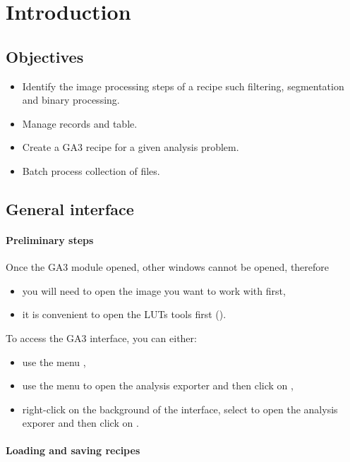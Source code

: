 \section{Introduction}

\subsection{Objectives}

\begin{itemize}
    \item Identify the image processing steps of a recipe such filtering, segmentation and binary processing.
    \item Manage records and table.
    \item Create a GA3 recipe for a given analysis problem.
    \item Batch process collection of files.
\end{itemize}

\subsection{General interface}

\paragraph{Preliminary steps}
Once the GA3 module opened, other windows cannot be opened, therefore
\begin{itemize}
    \item you will need to open the image you want to work with first,
    \item it is convenient to open the LUTs tools first ().
\end{itemize}
To access the GA3 interface, you can either:
\begin{itemize}
    \item use the menu ,
    \item use the menu  to open the analysis exporter and then click on ,
    \item right-click on the background of the interface, select  to open the analysis exporer and then click on .
\end{itemize}

\paragraph{Loading and saving recipes}

